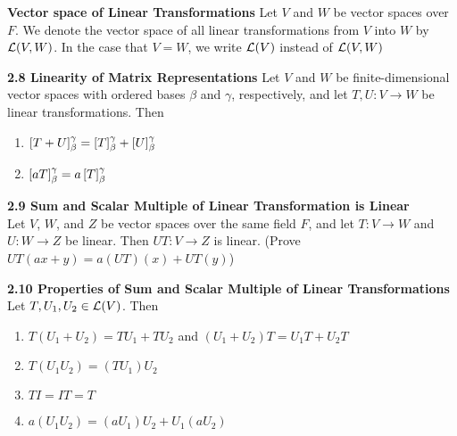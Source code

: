 \documentclass[11pt]{article}
\begin{document}
\begin{defn*}
    \textbf{Vector space of Linear Transformations} Let $V$ and $W$ be vector spaces over $F$. We denote the vector space of all linear transformations from $V$ into $W$ by $\mathcal{L}(V,W)$. In the case that $V=W$, we write $\mathcal{L}(V)$ instead of $\mathcal{L}(V,W)$
\end{defn*}

\begin{theorem*}
    \textbf{2.8 Linearity of Matrix Representations} Let $V$ and $W$ be finite-dimensional vector spaces with ordered bases $\beta$ and $\gamma$, respectively, and let $T,U:V\to W$ be linear transformations. Then 
    \begin{enumerate}
        \item $\left[ T+U \right]_{\beta}^{\gamma} = \left[ T \right]_{\beta}^{\gamma} + \left[ U \right]_{\beta}^{\gamma}$
        \item $\left[ aT \right]_{\beta}^{\gamma} = a\left[ T \right]_{\beta}^{\gamma}$ 
    \end{enumerate}
\end{theorem*}




\begin{theorem*}
    \textbf{2.9 Sum and Scalar Multiple of Linear Transformation is Linear} \\
    Let $V$, $W$, and $Z$ be vector spaces over the same field $F$, and let $T:V\to W$ and $U:W\to Z$ be linear. Then $UT:V\to Z$ is linear. (Prove $UT(ax+y)=a(UT)(x) + UT(y)$)
\end{theorem*}

\begin{theorem*}
    \textbf{2.10 Properties of Sum and Scalar Multiple of Linear Transformations} Let $T,U_1,U_2 \in \mathcal{L}(V)$. Then 
    \begin{enumerate}
        \item $T(U_1 + U_2) = TU_1 + TU_2$ and $(U_1 + U_2)T = U_1T + U_2T$
        \item $T(U_1 U_2) = (TU_1)U_2 $
        \item $TI = IT = T$ 
        \item $a(U_1 U_2) = (aU_1)U_2 + U_1 (a U_2)$
    \end{enumerate}
\end{theorem*}
\end{document}
